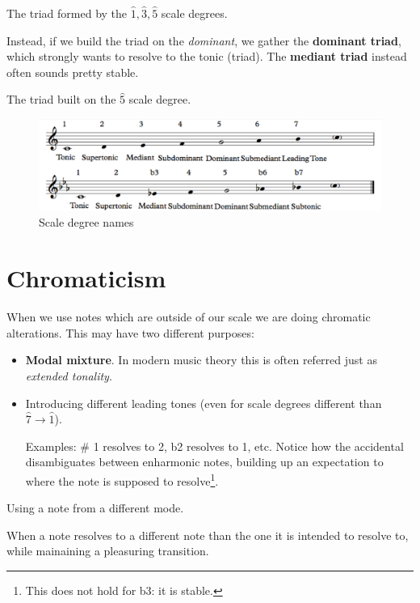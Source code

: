 \begin{definition}
    The triad formed by the $\hat 1, \hat 3, \hat 5$ scale degrees.
\end{definition}

Instead, if we build the triad on the \emph{dominant}, we gather the \textbf{dominant triad}, which strongly wants to resolve to the tonic (triad). The \textbf{mediant triad} instead often sounds pretty stable.

\begin{definition}
    The triad built on the $\hat 5$ scale degree.
\end{definition}

\begin{figure}
    \begin{center}
        \includegraphics[width=\textwidth]{img/degrees}
        \caption{Scale degree names}
    \end{center}
\end{figure}

\section{Chromaticism}
When we use notes which are outside of our scale we are doing chromatic alterations. This may have two different purposes:
\begin{itemize}
    \item \textbf{Modal mixture}. In modern music theory this is often referred just as \emph{extended tonality}.
    \item Introducing different leading tones (even for scale degrees different than $\hat 7 \to \hat 1$).
    
    Examples: \# 1 resolves to 2, b2 resolves to 1, etc. Notice how the accidental disambiguates between enharmonic notes, building up an expectation to where the note is supposed to resolve\footnote{This does not hold for b3: it is stable.}.
\end{itemize}

\begin{definition}
    Using a note from a different mode.
\end{definition}

\begin{definition}[Sublimation]
    When a note resolves to a different note than the one it is intended to resolve to, while mainaining a pleasuring transition.
\end{definition}